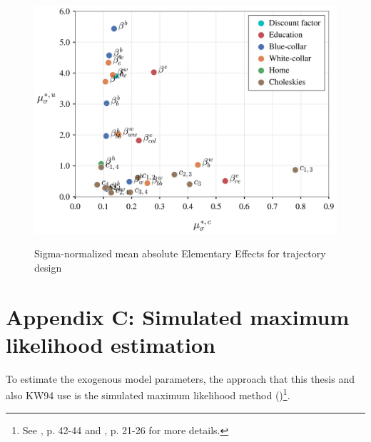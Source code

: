 \begin{figure}[H]
	\caption{Sigma-normalized mean absolute Elementary Effects for trajectory design}
	\centering
	\includegraphics[scale=0.52]{../scrypy/figures/scatter_traj}
	\label{fig:traj}
\end{figure}



\section*{Appendix C: Simulated maximum likelihood estimation}
\thispagestyle{plain} %
To estimate the exogenous model parameters, the approach that this thesis and also KW94 use is the simulated maximum likelihood method (\cite{Albright.1977})\footnote{See \cite{Aguirregabiria.2010}, p. 42-44 and \cite{Raabe.2019}, p. 21-26 for more details.}.

